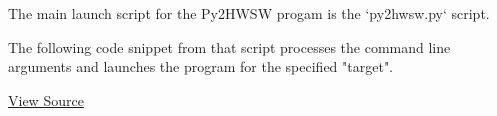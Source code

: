 %

The main launch script for the Py2HWSW progam is the `py2hwsw.py` script.

The following code snippet from that script processes the command line arguments and launches the program for the specified "target".

\href{https://github.com/IObundle/py2hwsw/blob/main/py2hwsw/scripts/py2hwsw.py}{View Source}


